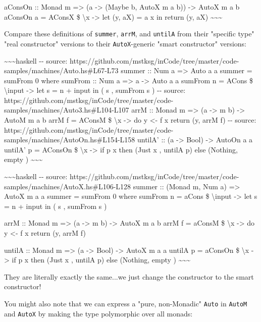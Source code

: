 \documentclass[]{article}
\begin{document}
aConsOn :: Monad m =\textgreater{} (a -\textgreater{} (Maybe b, AutoX m a b))
-\textgreater{} AutoX m a b aConsOn a = AConsX \$ \textbackslash{}x
-\textgreater{} let (y, aX) = a x in return (y, aX)
\textasciitilde{}\textasciitilde{}\textasciitilde{}

Compare these definitions of \texttt{summer}, \texttt{arrM}, and \texttt{untilA}
from their "specific type" "real constructor" versions to their
\texttt{AutoX}-generic "smart constructor" versions:

\textasciitilde{}\textasciitilde{}\textasciitilde{}haskell -\/- source:
https://github.com/mstksg/inCode/tree/master/code-samples/machines/Auto.hs\#L67-L73
summer :: Num a =\textgreater{} Auto a a summer = sumFrom 0 where sumFrom :: Num
a =\textgreater{} a -\textgreater{} Auto a a sumFrom n = ACons \$
\textbackslash{}input -\textgreater{} let s = n + input in ( s , sumFrom s )
-\/- source:
https://github.com/mstksg/inCode/tree/master/code-samples/machines/Auto3.hs\#L104-L107
arrM :: Monad m =\textgreater{} (a -\textgreater{} m b) -\textgreater{} AutoM m
a b arrM f = AConsM \$ \textbackslash{}x -\textgreater{} do y \textless{}- f x
return (y, arrM f) -\/- source:
https://github.com/mstksg/inCode/tree/master/code-samples/machines/AutoOn.hs\#L154-L158
untilA' :: (a -\textgreater{} Bool) -\textgreater{} AutoOn a a untilA' p =
AConsOn \$ \textbackslash{}x -\textgreater{} if p x then (Just x , untilA p)
else (Nothing, empty ) \textasciitilde{}\textasciitilde{}\textasciitilde{}

\textasciitilde{}\textasciitilde{}\textasciitilde{}haskell -\/- source:
https://github.com/mstksg/inCode/tree/master/code-samples/machines/AutoX.hs\#L106-L128
summer :: (Monad m, Num a) =\textgreater{} AutoX m a a summer = sumFrom 0 where
sumFrom n = aCons \$ \textbackslash{}input -\textgreater{} let s = n + input in
( s , sumFrom s )

arrM :: Monad m =\textgreater{} (a -\textgreater{} m b) -\textgreater{} AutoX m
a b arrM f = aConsM \$ \textbackslash{}x -\textgreater{} do y \textless{}- f x
return (y, arrM f)

untilA :: Monad m =\textgreater{} (a -\textgreater{} Bool) -\textgreater{} AutoX
m a a untilA p = aConsOn \$ \textbackslash{}x -\textgreater{} if p x then (Just
x , untilA p) else (Nothing, empty )
\textasciitilde{}\textasciitilde{}\textasciitilde{}

They are literally exactly the same...we just change the constructor to the
smart constructor!

You might also note that we can express a "pure, non-Monadic" \texttt{Auto} in
\texttt{AutoM} and \texttt{AutoX} by making the type polymorphic over all
monads:
\end{document}
